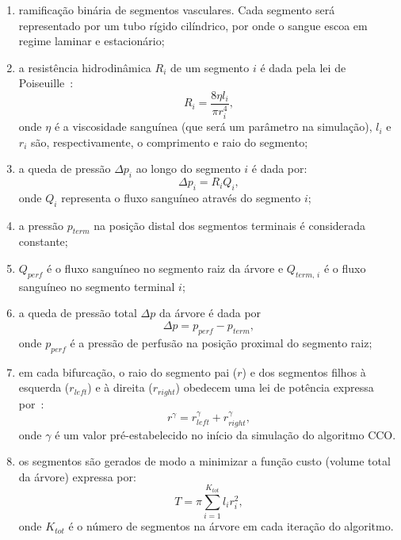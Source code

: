 \begin{enumerate}[label=(\roman*)]
\item ramifica\c{c}\~ao binária de segmentos vasculares. Cada segmento será 
representado por um tubo rígido cilíndrico, por onde o sangue escoa em regime 
laminar e estacionário;

\item a resistência hidrodinâmica $R_i$ de um segmento $i$ é dada pela lei 
de Poiseuille~\cite{Fung1996}:
\begin{equation}
R_i = \frac{8\eta l_i}{\pi r_i^4},\label{eq:resistencia}
\end{equation}
onde $\eta$ é a viscosidade sanguínea (que será um parâmetro na simulação), 
$l_i$ e $r_i$ são, respectivamente, o comprimento e raio do segmento;

\item a queda de pressão $\Delta p_i$ ao longo do segmento $i$ é dada por:
\begin{equation}
\Delta p_i = R_i Q_i,
\label{eq:quedapressao.i}
\end{equation} 
onde $Q_i$ representa o fluxo sanguíneo através do segmento $i$;

\item a pressão $p_{term}$ na posição distal dos segmentos terminais é considerada constante;

\item $Q_{perf}$ é o fluxo sanguíneo no segmento raiz da árvore e 
$Q_{term,\,i}$ é o fluxo sanguíneo no segmento terminal $i$;

\item  a queda de pressão total $\Delta p$ da árvore é dada por 
\begin{equation}
  \Delta p = p_{perf} - p_{term},\label{eq:quedapressao}
\end{equation}
onde $p_{perf}$ é a pressão de perfusão na posi\c{c}\~ao proximal do segmento raiz;

\item em cada bifurcação, o raio do segmento pai ($r$) e dos segmentos filhos à esquerda ($r_{left}$) e 
à direita ($r_{right}$) obedecem uma lei de potência expressa por~\cite{Sherman1981}:
\begin{equation}
r^{\gamma} = r_{left}^{\gamma} + r_{right}^{\gamma},\label{eq:leibifurcacao}
\end{equation}
onde $\gamma$ é um valor pré-estabelecido no início da simulação do algoritmo CCO.

\item os segmentos são gerados de modo a minimizar a função custo (volume total da árvore)
expressa por:
\begin{equation}
  T = \pi \sum_{i=1}^{K_{tot}} l_i r_i^2,
  \label{eq:volume}
\end{equation}
onde $K_{tot}$ é o número de segmentos na árvore em cada iteração do algoritmo.
\end{enumerate}

